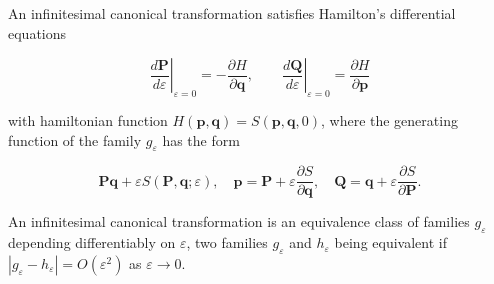 An infinitesimal canonical transformation satisfies Hamilton's differential equations

$$\left. \frac{d\mathbf{P}}{d\varepsilon} \right|_{\varepsilon=0} = -\frac{\partial H}{\partial \mathbf{q}}, \qquad \left. \frac{d\mathbf{Q}}{d\varepsilon} \right|_{\varepsilon=0} = \frac{\partial H}{\partial \mathbf{p}}$$

with hamiltonian function $H(\mathbf{p}, \mathbf{q}) = S(\mathbf{p}, \mathbf{q}, 0)$, where the generating function of the family $g_\varepsilon$ has the form

$$\mathbf{P}\mathbf{q} + \varepsilon S(\mathbf{P}, \mathbf{q}; \varepsilon), \quad \mathbf{p} = \mathbf{P} + \varepsilon \frac{\partial S}{\partial \mathbf{q}}, \quad \mathbf{Q} = \mathbf{q} + \varepsilon \frac{\partial S}{\partial \mathbf{P}}.$$

An infinitesimal canonical transformation is an equivalence class of families $g_\varepsilon$ depending differentiably on $\varepsilon$, two families $g_\varepsilon$ and $h_\varepsilon$ being equivalent if $|g_\varepsilon - h_\varepsilon| = O(\varepsilon^2)$ as $\varepsilon \to 0$.
